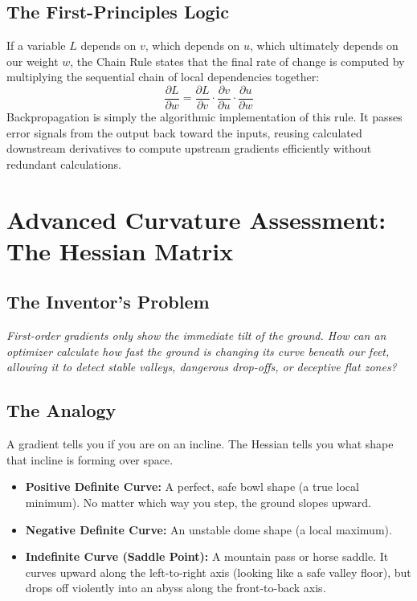 \documentclass[12pt,a4paper]{article}
\begin{document}
\subsection*{The First-Principles Logic}
If a variable $L$ depends on $v$, which depends on $u$, which ultimately depends on our weight $w$, the Chain Rule states that the final rate of change is computed by multiplying the sequential chain of local dependencies together:
$$\frac{\partial L}{\partial w} = \frac{\partial L}{\partial v} \cdot \frac{\partial v}{\partial u} \cdot \frac{\partial u}{\partial w}$$
Backpropagation is simply the algorithmic implementation of this rule. It passes error signals from the output back toward the inputs, reusing calculated downstream derivatives to compute upstream gradients efficiently without redundant calculations.

\section{Advanced Curvature Assessment: The Hessian Matrix}
\subsection*{The Inventor's Problem}
\textit{First-order gradients only show the immediate tilt of the ground. How can an optimizer calculate how fast the ground is changing its curve beneath our feet, allowing it to detect stable valleys, dangerous drop-offs, or deceptive flat zones?}

\subsection*{The Analogy}
A gradient tells you if you are on an incline. The Hessian tells you what shape that incline is forming over space. 
\begin{itemize}
    \item \textbf{Positive Definite Curve:} A perfect, safe bowl shape (a true local minimum). No matter which way you step, the ground slopes upward.
    \item \textbf{Negative Definite Curve:} An unstable dome shape (a local maximum).
    \item \textbf{Indefinite Curve (Saddle Point):} A mountain pass or horse saddle. It curves upward along the left-to-right axis (looking like a safe valley floor), but drops off violently into an abyss along the front-to-back axis.
\end{itemize}
\end{document}

